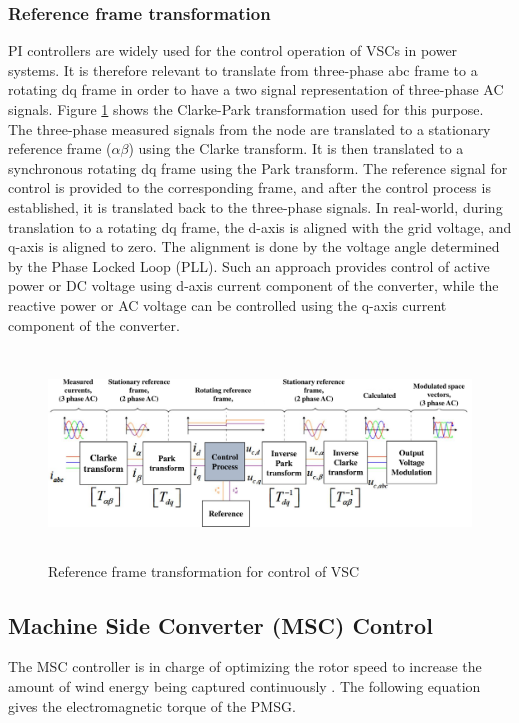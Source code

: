 \subsubsection{Reference frame transformation}\label{ref_frame_trafo}
\gls{PI} controllers are widely used for the control operation of \gls{VSC}s in power systems. It is therefore relevant to translate from three-phase abc frame to a rotating \gls{dq} frame in order to have a two signal representation of three-phase \gls{AC} signals. Figure \ref{fig:DQTransformation} shows the Clarke-Park transformation used for this purpose. The three-phase measured signals from the node are translated to a stationary reference frame ($\alpha \beta$) using the Clarke transform. It is then translated to a synchronous rotating \gls{dq} frame using the Park transform. The reference signal for control is provided to the corresponding frame, and after the control process is established, it is translated back to the three-phase signals. In real-world, during translation to a rotating \gls{dq} frame, the d-axis is aligned with the grid voltage, and q-axis is aligned to zero. The alignment is done by the voltage angle determined by the Phase Locked Loop (\gls{PLL}). Such an approach provides control of active power or \gls{DC} voltage using d-axis current component of the converter, while the reactive power or \gls{AC} voltage can be controlled using the q-axis current component of the converter.   

\begin{figure}[H]
\centering
    \includegraphics[height = 5.5cm,width = 15.5cm]{Diagrams/Chapter_2/DQTransformation_2.pdf}
    \caption{Reference frame transformation for control of VSC \cite{ndreko2017offshore}}
    \label{fig:DQTransformation}
\end{figure}

\subsection{Machine Side Converter (MSC) Control}
The \gls{MSC} controller is in charge of optimizing the rotor speed to increase the amount of wind energy being captured continuously \cite{strachan_stability_2010}. %
The following equation gives the electromagnetic torque of the \gls{PMSG}.

